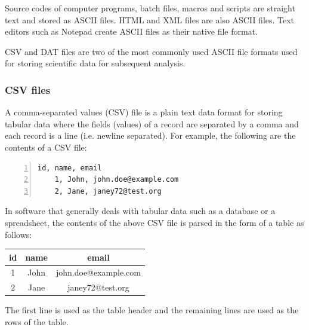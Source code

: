     	Source codes of computer programs, batch files, macros and scripts are straight text and stored as ASCII files. HTML and XML files are also ASCII files. Text editors such as Notepad create ASCII files as their native file format.
    	
    	CSV and DAT files are two of the most commonly used ASCII file formats used for storing scientific data for subsequent analysis.
    	
    	\subsubsection{CSV files}
	    	A comma-separated values (CSV) file is a plain text data format for storing tabular data where the fields (values) of a record are separated by a comma and each record is a line (i.e. newline separated). For example, the following are the contents of a CSV file:
	    	\begin{Verbatim}[frame=single, numbers=left]
	id, name, email
	1, John, john.doe@example.com
	2, Jane, janey72@test.org
	    	\end{Verbatim}
	    	
	    	In software that generally deals with tabular data such as a database or a spreadsheet, the contents of the above CSV file is parsed in the form of a table as follows:
	    	\begin{table}[h!]
	    		\centering
	    		\begin{tabular}{|c|c|c|}
	    			\hline
	    			\textbf{id} & \textbf{name} & \textbf{email} \\ \hline
	    			{1} & {John} & {john.doe@example.com} \\ \hline
	    			{2} & {Jane} & {janey72@test.org} \\ \hline
	    		\end{tabular}
	    	\end{table}
	    	
	    	The first line is used as the table header and the remaining lines are used as the rows of the table.
	    	
